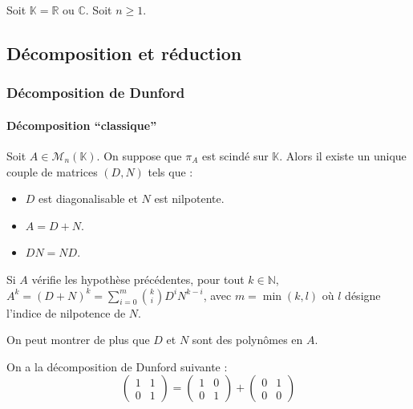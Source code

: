 



  Soit $\mathbb{K} = \mathbb{R}$ ou $\mathbb{C}$. Soit $n \geq 1$.

  \subsection{Décomposition et réduction}

  \subsubsection{Décomposition de Dunford}

  \paragraph{Décomposition ``classique''}


  \begin{theorem}
    Soit $A \in \mathcal{M}_n(\mathbb{K})$. On suppose que $\pi_A$ est scindé sur $\mathbb{K}$. Alors il existe un unique couple de matrices $(D, N)$ tels que :
    \begin{itemize}
      \item $D$ est diagonalisable et $N$ est nilpotente.
      \item $A = D + N$.
      \item $DN = ND$.
    \end{itemize}
  \end{theorem}

  \begin{corollary}
    Si $A$ vérifie les hypothèse précédentes, pour tout $k \in \mathbb{N}$, $A^k = (D + N)^k = \sum_{i=0}^m \binom{k}{i} D^i N^{k-i}$, avec $m = \min(k, l)$ où $l$ désigne l'indice de nilpotence de $N$.
  \end{corollary}

  \begin{remark}
    On peut montrer de plus que $D$ et $N$ sont des polynômes en $A$.
  \end{remark}


  \begin{example}
    On a la décomposition de Dunford suivante :
    \[ \begin{pmatrix} 1 & 1 \\ 0 & 1 \end{pmatrix} = \begin{pmatrix} 1 & 0 \\ 0 & 1 \end{pmatrix} + \begin{pmatrix} 0 & 1 \\ 0 & 0 \end{pmatrix} \]
  \end{example}

